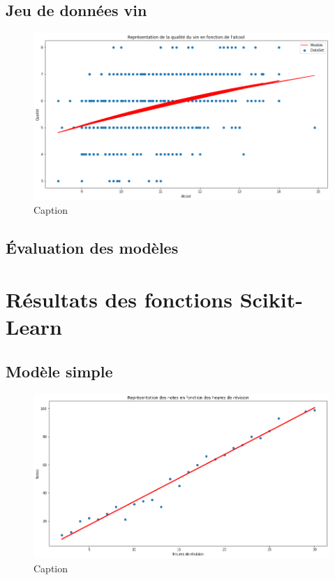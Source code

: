 \documentclass[french]{article}
\begin{document}

\subsection{Jeu de données vin}

\begin{figure}[!htbp]
    \centering
    \includegraphics[width=\textwidth]{Rapport/images/modele_MLP2.png}
    \caption{Caption}
    \label{fig:my_label}
\end{figure}

\subsection{Évaluation des modèles}

\newpage

\section{Résultats des fonctions Scikit-Learn}
\subsection{Modèle simple}

\begin{figure}[!htbp]
    \centering
    \includegraphics[width=\textwidth]{Rapport/images/modele_SLLS.png}
    \caption{Caption}
    \label{fig:my_label}
\end{figure}
\end{document}
